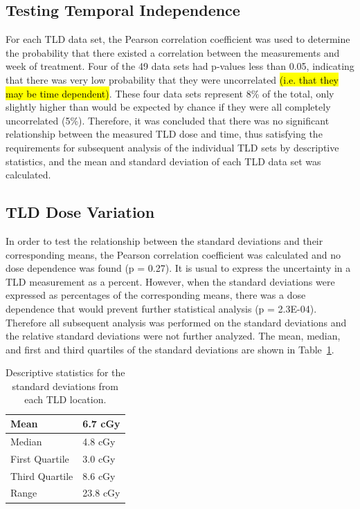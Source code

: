 \subsection{Testing Temporal Independence}
For each TLD data set, the Pearson correlation coefficient was used to determine the probability that there existed a correlation between the measurements and week of treatment. Four of the 49 data sets had p-values less than 0.05, indicating that there was very low probability that they were uncorrelated \hl{(i.e. that they may be time dependent)}. These four data sets represent 8\% of the total, only slightly higher than would be expected by chance if they were all completely uncorrelated (5\%). Therefore, it was concluded that there was no significant relationship between the measured TLD dose and time, thus satisfying the requirements for subsequent analysis of the individual TLD sets by descriptive statistics, and the mean and standard deviation of each TLD data set was calculated.

\subsection{TLD Dose Variation}
In order to test the relationship between the standard deviations and their corresponding means, the Pearson correlation coefficient was calculated and no dose dependence was found (p = 0.27).    It is usual to express the uncertainty in a TLD measurement as a percent. However, when the standard deviations were expressed as percentages of the corresponding means, there was a dose dependence that would prevent further statistical analysis (p = 2.3E-04). Therefore all subsequent analysis was performed on the standard deviations and the relative standard deviations were not further analyzed. The mean, median, and first and third quartiles of the standard deviations are shown in Table~\ref{tab:descrip_stats}.

\begin{table}[h]
	\centering
	\caption{Descriptive statistics for the standard deviations from each TLD location.}
	\label{tab:descrip_stats}
	\begin{tabular}{|l|l|}
		\hline
		Mean           & 6.7 cGy  \\ \hline
		Median         & 4.8 cGy  \\ \hline
		First Quartile & 3.0 cGy  \\ \hline
		Third Quartile & 8.6 cGy  \\ \hline
		Range          & 23.8 cGy \\ \hline
	\end{tabular}
\end{table}

